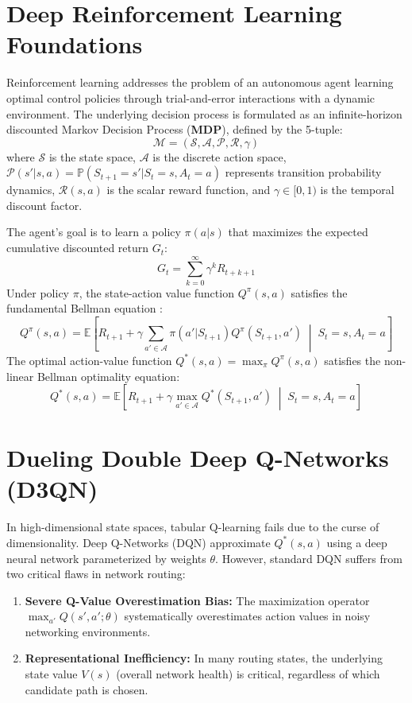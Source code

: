 \documentclass[12pt,a4paper,oneside]{report}
\begin{document}
\section{Deep Reinforcement Learning Foundations}
Reinforcement learning addresses the problem of an autonomous agent learning optimal control policies through trial-and-error interactions with a dynamic environment. The underlying decision process is formulated as an infinite-horizon discounted Markov Decision Process (\textbf{MDP}), defined by the 5-tuple:
\begin{equation}
\mathcal{M} = \left( \mathcal{S}, \mathcal{A}, \mathcal{P}, \mathcal{R}, \gamma \right)
\end{equation}
where $\mathcal{S}$ is the state space, $\mathcal{A}$ is the discrete action space, $\mathcal{P}(s' | s, a) = \mathbb{P}(S_{t+1} = s' | S_t = s, A_t = a)$ represents transition probability dynamics, $\mathcal{R}(s, a)$ is the scalar reward function, and $\gamma \in [0, 1)$ is the temporal discount factor.

The agent's goal is to learn a policy $\pi(a | s)$ that maximizes the expected cumulative discounted return $G_t$:
\begin{equation}
G_t = \sum_{k=0}^{\infty} \gamma^k R_{t+k+1}
\end{equation}
Under policy $\pi$, the state-action value function $Q^\pi(s, a)$ satisfies the fundamental Bellman equation \cite{sutton2018reinforcement}:
\begin{equation}
Q^\pi(s, a) = \mathbb{E}\left[ R_{t+1} + \gamma \sum_{a' \in \mathcal{A}} \pi(a' | S_{t+1}) Q^\pi(S_{t+1}, a') \;\middle|\; S_t = s, A_t = a \right]
\end{equation}
The optimal action-value function $Q^*(s, a) = \max_\pi Q^\pi(s, a)$ satisfies the non-linear Bellman optimality equation:
\begin{equation}
Q^*(s, a) = \mathbb{E}\left[ R_{t+1} + \gamma \max_{a' \in \mathcal{A}} Q^*(S_{t+1}, a') \;\middle|\; S_t = s, A_t = a \right]
\end{equation}

\section{Dueling Double Deep Q-Networks (D3QN)}
In high-dimensional state spaces, tabular Q-learning fails due to the curse of dimensionality. Deep Q-Networks (DQN) \cite{mnih2015human} approximate $Q^*(s, a)$ using a deep neural network parameterized by weights $\theta$. However, standard DQN suffers from two critical flaws in network routing:
\begin{enumerate}
    \item \textbf{Severe Q-Value Overestimation Bias:} The maximization operator $\max_{a'} Q(s', a'; \theta)$ systematically overestimates action values in noisy networking environments.
    \item \textbf{Representational Inefficiency:} In many routing states, the underlying state value $V(s)$ (overall network health) is critical, regardless of which candidate path is chosen.
\end{enumerate}
\end{document}
